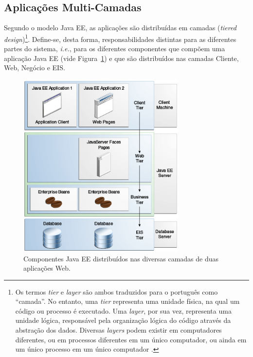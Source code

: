 \documentclass[
  10.5pt,				  %
	openright,			%
	twoside,			  %
  a5paper,
  chapter=TITLE,	%
	section=TITLE,	%
  hyphens,        %
	english,        %
	brazil          %
]{abntex2}
\begin{document}
\subsection{Aplicações Multi-Camadas}

Segundo o modelo Java EE, as aplicações são distribuídas em camadas (\emph{tiered design})\footnote{Os termos \emph{tier} e \emph{layer} são ambos traduzidos para o português como ``camada''. No entanto, uma \emph{tier} representa uma unidade física, na qual um código ou processo é executado. Uma \emph{layer}, por sua vez, representa uma unidade lógica, responsável pela organização lógica do código através da abstração dos dados. Diversas \emph{layers} podem existir em computadores diferentes, ou em processos diferentes em um único computador, ou ainda em um único processo em um único computador \cite{lhotka}.}. Define-se, desta forma, responsabilidades distintas para as diferentes partes do sistema, \emph{i.e.}, para os diferentes componentes que compõem uma aplicação Java EE (vide Figura~\ref{fig:multitiered_app}) e que são distribuídos nas camadas Cliente, Web, Negócio e EIS.

\begin{figure}[!ht]
  \caption{\label{fig:multitiered_app}Componentes Java EE distribuídos nas diversas camadas de duas aplicações Web.}
  \begin{center}
    \includegraphics[width=0.75\textwidth]{multitiered_applications.png}
  \end{center}
\end{figure}
\end{document}
